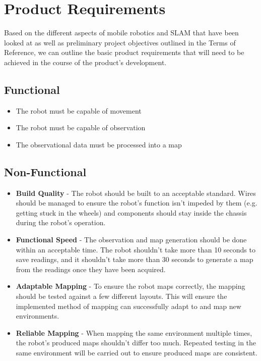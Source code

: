 		\chapter{Product Requirements}
		\label{requirements}
		Based on the different aspects of mobile robotics and SLAM that have been looked at as well as preliminary project objectives outlined in the Terms of Reference, we can outline the basic product requirements that will need to be achieved in the course of the product's development.
		
			\section{Functional}
			\label{requirements:functional}
			\begin{itemize}
				\item The robot must be capable of movement
				\item The robot must be capable of observation
				\item The observational data must be processed into a map
			\end{itemize}
			
			\section{Non-Functional}
			\label{requirements:nonfunctional}
			\begin{itemize}
				\item \textbf{Build Quality} - The robot should be built to an acceptable standard. Wires should be managed to ensure the robot's function isn't impeded by them (e.g. getting stuck in the wheels) and components should stay inside the chassis during the robot's operation.
				\item \textbf{Functional Speed} - The observation and map generation should be done within an acceptable time. The robot shouldn't take more than 10 seconds to save readings, and it shouldn't take more than 30 seconds to generate a map from the readings once they have been acquired.
				\item \textbf{Adaptable Mapping} - To ensure the robot maps correctly, the mapping should be tested against a few different layouts. This will ensure the implemented method of mapping can successfully adapt to and map new environments.
				\item \textbf{Reliable Mapping} - When mapping the same environment multiple times, the robot's produced maps shouldn't differ too much. Repeated testing in the same environment will be carried out to ensure produced maps are consistent.
			\end{itemize}
		
